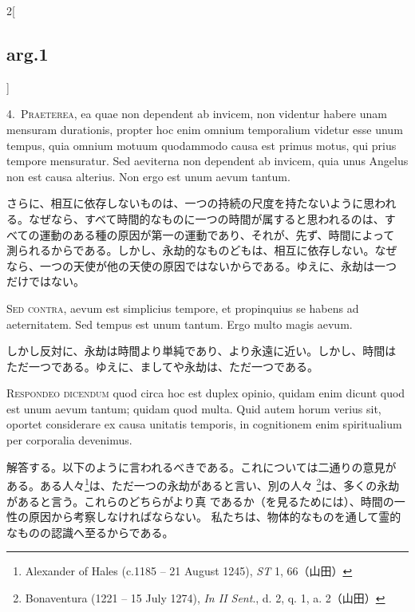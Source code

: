 \documentclass[paper=a4paper,fontsize=10pt,jafontsize=9pt,titlepage]{jlreq}
\begin{document}
\begin{paracol}{2}[\subsection{arg.1}]

4.~{\scshape Praeterea}, ea quae non dependent ab invicem, non videntur habere unam
mensuram durationis, propter hoc enim omnium temporalium videtur esse
unum tempus, quia omnium motuum quodammodo causa est primus motus, qui
prius tempore mensuratur. Sed aeviterna non dependent ab invicem, quia
unus Angelus non est causa alterius. Non ergo est unum aevum tantum.

\switchcolumn

さらに、相互に依存しないものは、一つの持続の尺度を持たないように思われ
る。なぜなら、すべて時間的なものに一つの時間が属すると思われるのは、す
べての運動のある種の原因が第一の運動であり、それが、先ず、時間によって
測られるからである。しかし、永劫的なものどもは、相互に依存しない。なぜ
なら、一つの天使が他の天使の原因ではないからである。ゆえに、永劫は一つ
だけではない。

\switchcolumn*[\subsection{s.c.}]

{\scshape Sed contra}, aevum est simplicius tempore, et propinquius se habens ad
aeternitatem. Sed tempus est unum tantum. Ergo multo magis aevum.

\switchcolumn

しかし反対に、永劫は時間より単純であり、より永遠に近い。しかし、時間は
ただ一つである。ゆえに、ましてや永劫は、ただ一つである。


{\scshape Respondeo dicendum} quod circa hoc est duplex opinio, quidam enim dicunt
quod est unum aevum tantum; quidam quod multa. Quid autem horum verius
sit, oportet considerare ex causa unitatis temporis, in cognitionem enim
spiritualium per corporalia devenimus.

\switchcolumn

解答する。以下のように言われるべきである。これについては二通りの意見が
ある。ある人々\footnote{Alexander of Hales (c.1185 -- 21 August 1245),
{\itshape ST} 1, 66（山田）}は、ただ一つの永劫があると言い、別の人々
\footnote{Bonaventura (1221 -- 15 July 1274), {\itshape In II Sent}., d. 2,
q. 1, a. 2（山田）}は、多くの永劫があると言う。これらのどちらがより真
であるか（を見るためには）、時間の一性の原因から考察しなければならない。
私たちは、物体的なものを通して霊的なものの認識へ至るからである。


\end{paracol}
\end{document}
